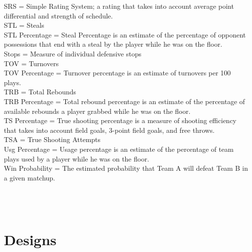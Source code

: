 \documentclass[journal,onecolumn]{IEEEtran}
\begin{document}
SRS = Simple Rating System; a rating that takes into account average point differential and strength of schedule. \\
STL = Steals \\
STL Percentage = Steal Percentage is an estimate of the percentage of opponent possessions that end with a steal by the player while he was on the floor.\\
Stops = Measure of individual defensive stops\\
TOV = Turnovers\\
TOV Percentage = Turnover percentage is an estimate of turnovers per 100 plays.\\
TRB = Total Rebounds\\
TRB Percentage = Total rebound percentage is an estimate of the percentage of available rebounds a player grabbed while he was on the floor.\\
TS Percentage = True shooting percentage is a measure of shooting efficiency that takes into account field goals, 3-point field goals, and free throws.\\
TSA = True Shooting Attempts\\
Usg Percentage = Usage percentage is an estimate of the percentage of team plays used by a player while he was on the floor.\\
Win Probability = The estimated probability that Team A will defeat Team B in a given matchup.\\
\\
\\
\\

\section{Designs}
\end{document}
